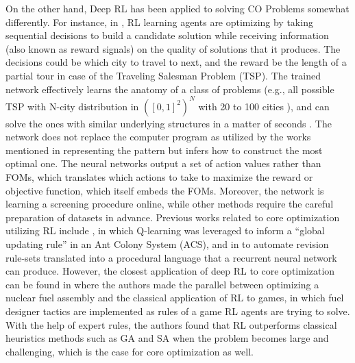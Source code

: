 \documentclass[a4paper]{article}
\begin{document}
On the other hand, Deep RL has been applied to solving CO Problems somewhat differently. For instance, in \cite{bello2016neural,khalil2017learning,li2021deep}, RL learning agents are optimizing by taking sequential decisions to build a candidate solution while receiving information (also known as reward signals) on the quality of solutions that it produces. The decisions could be which city to travel to next, and the reward be the length of a partial tour in case of the Traveling Salesman Problem (TSP). The trained network effectively learns the anatomy of a class of problems (e.g., all possible TSP with N-city distribution in $([0,1]^2)^N$ with 20 to 100 cities \cite{bello2016neural}), and can solve the ones with similar underlying structures in a matter of seconds \cite{li2021deep}. The network does not replace the computer program as utilized by the works mentioned in representing the pattern but infers how to construct the most optimal one. The neural networks output a set of action values rather than FOMs, which translates which actions to take to maximize the reward or objective function, which itself embeds the FOMs. Moreover, the network is learning a screening procedure online, while other methods require the careful preparation of datasets in advance. Previous works related to core optimization utilizing RL include \cite{lima2008anuclear}, in which Q-learning was leveraged to inform a “global updating rule” in an Ant Colony System (ACS), and in \cite{nissan1997upgrading} to automate revision rule-sets translated into a procedural language that a recurrent neural network can produce. However, the closest application of deep RL to core optimization can be found in \cite{radaideh2021physics} where the authors made the parallel between optimizing a nuclear fuel assembly and the classical application of RL to games, in which fuel designer tactics are implemented as rules of a game RL agents are trying to solve. With the help of expert rules, the authors found that RL outperforms classical heuristics methods such as GA and SA when the problem becomes large and challenging, which is the case for core optimization as well.
\end{document}
